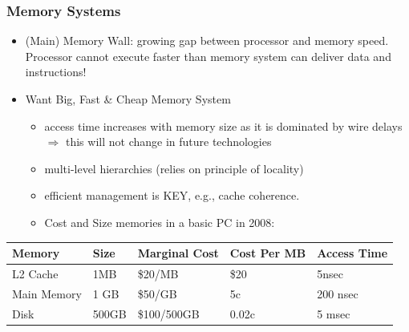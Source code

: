 \documentclass{beamer}
\newcommand{\emp}[1]{\textcolor{DikuRed}{ #1}}
\begin{document}
\begin{frame}[fragile,t]
\frametitle{Memory Systems}

\begin{itemize}
    \item \emp{(Main) Memory Wall:} growing gap between processor and memory speed.
            Processor cannot execute faster than memory system can deliver data 
            and instructions!\bigskip

    \item Want Big, Fast \& Cheap Memory System\smallskip
    \begin{itemize}
        \item access time 
                increases with memory size as it is dominated by 
                wire delays$\Rightarrow$ this will not change in future technologies\smallskip
        \item multi-level hierarchies (relies on principle of locality)\smallskip
        \item efficient management is KEY, e.g., cache coherence.\smallskip
        \item Cost and Size memories in a basic PC in 2008:
    \end  {itemize} 
\end{itemize}
\bigskip

\begin{tabular}{|l|l|l|l|l|}\hline
Memory & Size  & Marginal Cost & Cost Per MB & Access Time \\\hline
L2 Cache & 1MB & \$20/MB & \$20 & 5nsec \\\hline
Main Memory & 1 GB & \$50/GB & 5c & 200 nsec \\\hline
Disk & 500GB & \$100/500GB & 0.02c & 5 msec \\\hline
\end{tabular}

\end{frame}
\end{document}
